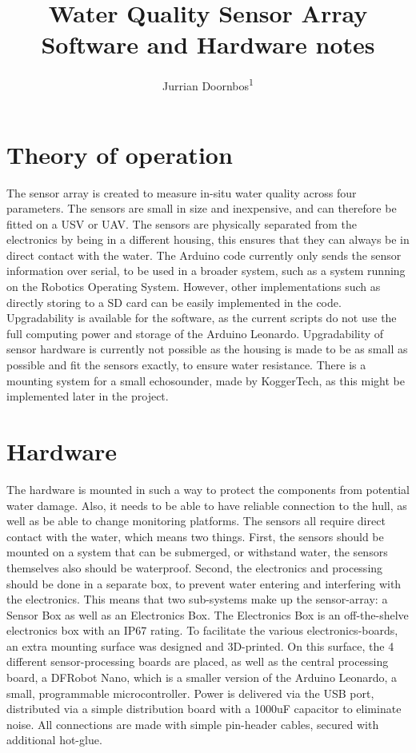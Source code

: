 \documentclass[
  english,
  man,floatsintext]{apa6}
\title{Water Quality Sensor Array Software and Hardware notes}
\author{Jurrian Doornbos\textsuperscript{1}}
\date{}
\affiliation{\vspace{0.5cm}\textsuperscript{1} Laboratory of Geo-Information Science and Remote Sensing, Wageningen University \& Research}
\begin{document}
\maketitle

\hypertarget{theory-of-operation}{%
\section{Theory of operation}\label{theory-of-operation}}

The sensor array is created to measure in-situ water quality across four parameters. The sensors are small in size and inexpensive, and can therefore be fitted on a USV or UAV.
The sensors are physically separated from the electronics by being in a different housing, this ensures that they can always be in direct contact with the water. The Arduino code currently only sends the sensor information over serial, to be used in a broader system, such as a system running on the Robotics Operating System. However, other implementations such as directly storing to a SD card can be easily implemented in the code. Upgradability is available for the software, as the current scripts do not use the full computing power and storage of the Arduino Leonardo. Upgradability of sensor hardware is currently not possible as the housing is made to be as small as possible and fit the sensors exactly, to ensure water resistance. There is a mounting system for a small echosounder, made by KoggerTech, as this might be implemented later in the project.

\newpage

\hypertarget{hardware}{%
\section{Hardware}\label{hardware}}

The hardware is mounted in such a way to protect the components from potential water damage. Also, it needs to be able to have reliable connection to the hull, as well as be able to change monitoring platforms. The sensors all require direct contact with the water, which means two things. First, the sensors should be mounted on a system that can be submerged, or withstand water, the sensors themselves also should be waterproof. Second, the electronics and processing should be done in a separate box, to prevent water entering and interfering with the electronics. This means that two sub-systems make up the sensor-array: a Sensor Box as well as an Electronics Box.
The Electronics Box is an off-the-shelve electronics box with an IP67 rating. To facilitate the various electronics-boards, an extra mounting surface was designed and 3D-printed. On this surface, the 4 different sensor-processing boards are placed, as well as the central processing board, a DFRobot Nano, which is a smaller version of the Arduino Leonardo, a small, programmable microcontroller. Power is delivered via the USB port, distributed via a simple distribution board with a 1000uF capacitor to eliminate noise. All connections are made with simple pin-header cables, secured with additional hot-glue.
\end{document}
